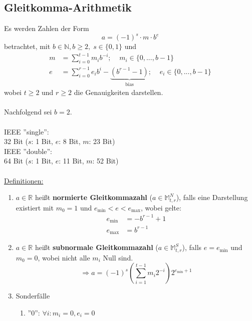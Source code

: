 \documentclass[4pt,a4paper]{scrartcl}
\begin{document}
\begin{multicols}{4}
\subsection{Gleitkomma-Arithmetik}
Es werden Zahlen der Form
\begin{equation*}
a=(-1)^s\cdot m\cdot b^e
\end{equation*}
betrachtet, mit $b\in\mathbb{N}, b\geq 2,\;s\in\{0,1\}$ und
\begin{equation*}
\begin{split}
m&=\sum_{i=0}^{t-1}m_ib^{-i};\;\;\;\;m_i\in\{0,...,b-1\}\\
e&=\sum_{i=0}^{r-1}e_ib^i-\underbrace{(b^{r-1}-1)}_{\text{bias}}; \;\;\;\;e_i\in\{0,...,b-1\}
\end{split}
\end{equation*}
wobei $t\geq 2$ und $r\geq 2$ die Genauigkeiten darstellen.\\\\
Nachfolgend sei $b=2$.\\\\
IEEE ''single'':\\
32 Bit ($s$: 1 Bit, $e$: 8 Bit, $m$: 23 Bit)\\
IEEE ''double'':\\
64 Bit ($s$: 1 Bit, $e$: 11 Bit, $m$: 52 Bit)\\\\
\underline{Definitionen:}
\begin{enumerate}[label=$\bullet$]
\item $a\in\mathbb{R}$ heißt \textbf{normierte Gleitkommazahl} ($a\in\mathbb{M}_{t,r}^N$), falls eine Darstellung existiert mit $m_0=1$ und $e_{\text{min}}<e<e_{\text{max}}$, wobei gelte:
\begin{equation*}
\begin{split}
e_{\text{min}}&=-b^{r-1}+1\\
e_{\text{max}}&=b^{r-1}
\end{split}
\end{equation*}
\item $a\in\mathbb{R}$ heißt \textbf{subnormale Gleitkommazahl} ($a\in\mathbb{M}_{t,r}^S$), falls $e=e_{\text{min}}$ und $m_0=0$, wobei nicht alle $m_i$ Null sind.
\begin{equation*}
\Rightarrow a=(-1)^s\left(\sum_{i=1}^{t-1}m_i2^{-i}\right)2^{e_{\text{min}}+1}
\end{equation*}
\item Sonderfälle
\begin{enumerate}[label=-]
\item ''0'': $\forall i: m_i=0,e_i=0$

\end{enumerate}
\end{enumerate}
\end{multicols}
\end{document}
